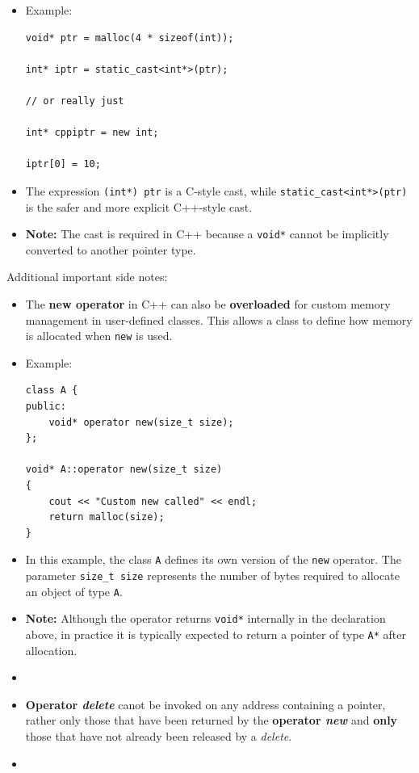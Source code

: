 \documentclass[10pt]{article}
\begin{document}
\begin{itemize}
\item Example:
\begin{verbatim}
void* ptr = malloc(4 * sizeof(int));

int* iptr = static_cast<int*>(ptr);

// or really just

int* cppiptr = new int;

iptr[0] = 10;
\end{verbatim}

\item The expression \verb|(int*) ptr| is a C-style cast, while \verb|static_cast<int*>(ptr)| is the safer and more explicit C++-style cast.

\item \textbf{Note:} The cast is required in C++ because a \verb|void*| cannot be implicitly converted to another pointer type.


\end{itemize}

\newpage

Additional important side notes:
\begin{itemize}
\item The \textbf{new operator} in C++ can also be \textbf{overloaded} for custom memory management in user-defined classes. This allows a class to define how memory is allocated when \verb|new| is used.

\item Example:
\begin{verbatim}
class A {
public:
    void* operator new(size_t size);
};

void* A::operator new(size_t size)
{
    cout << "Custom new called" << endl;
    return malloc(size);
}
\end{verbatim}

\item In this example, the class \verb|A| defines its own version of the \verb|new| operator. The parameter \verb|size_t size| represents the number of bytes required to allocate an object of type \verb|A|.

\item \textbf{Note:} Although the operator returns \verb|void*| internally in the declaration above, in practice it is typically expected to return a pointer of type \verb|A*| after allocation.
\end{itemize}

\newpage

\begin{itemize}
\item {}
\item \textbf{Operator \textit{delete}} canot be invoked on any address containing a pointer, rather only those that have been returned by the \textbf{operator \textit{new}} and \textbf{only} those that have not already been released by a \textit{delete}.

\item {}
\end{itemize}
\end{document}
